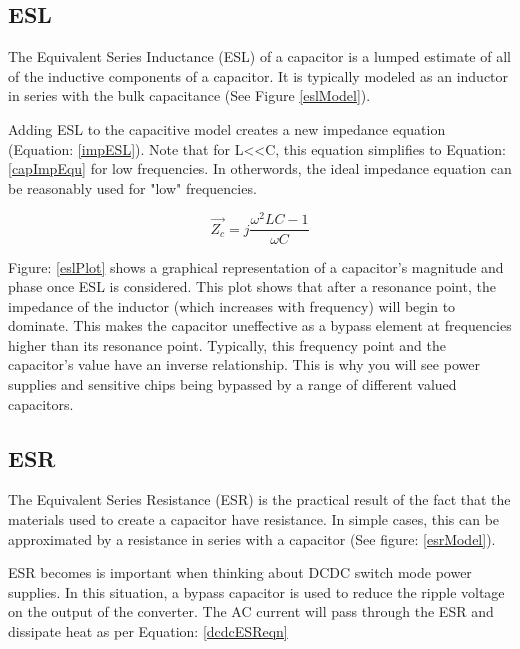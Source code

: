 \subsection{ESL}

The Equivalent Series Inductance (ESL) of a capacitor is a lumped estimate of all of the inductive components of a capacitor. It is typically modeled as an inductor in series with the bulk capacitance (See Figure \ref{eslModel}).



Adding ESL to the capacitive model creates a new impedance equation (Equation: \eqref{impESL}). Note that for L\textless \textless C, this equation simplifies to Equation: \eqref{capImpEqu} for low frequencies. In otherwords, the ideal impedance equation can be reasonably used for "low" frequencies.

\begin{equation}
\label{impESL}
\vec{Z_c} = j\frac{\omega ^2LC - 1}{\omega C}
\end{equation}



Figure: \ref{eslPlot} shows a graphical representation of a capacitor's magnitude and phase once ESL is considered. This plot shows that after a resonance point, the impedance of the inductor (which increases with frequency) will begin to dominate. This makes the capacitor uneffective as a bypass element at frequencies higher than its resonance point. Typically, this frequency point and the capacitor's value have an inverse relationship. This is why you will see power supplies and sensitive chips being bypassed by a range of different valued capacitors. 

\subsection{ESR}

The Equivalent Series Resistance (ESR) is the practical result of the fact that the materials used to create a capacitor have resistance. In simple cases, this can be approximated by a resistance in series with a capacitor (See figure: \ref{esrModel}).

ESR becomes is important when thinking about DCDC switch mode power supplies. In this situation, a bypass capacitor is used to reduce the ripple voltage on the output of the converter. The AC current will pass through the ESR and dissipate heat as per Equation: \eqref{dcdcESReqn}

